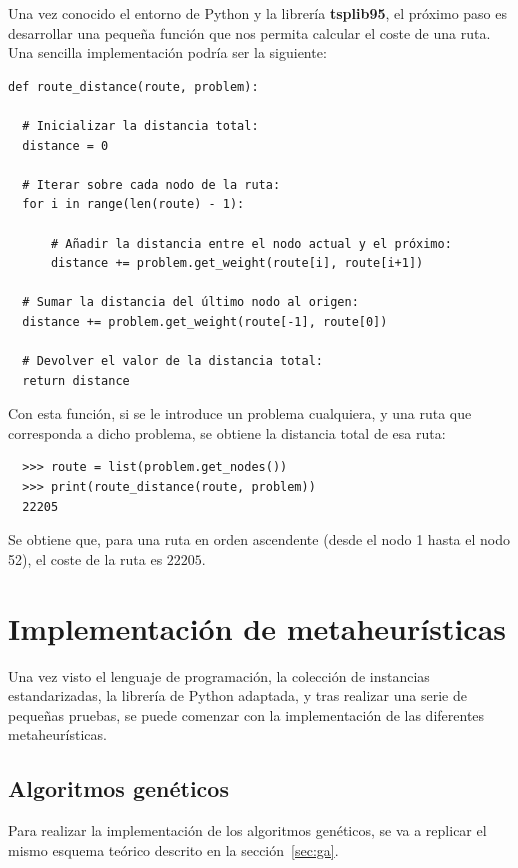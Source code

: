 Una vez conocido el entorno de Python y la librería \textbf{tsplib95}, el próximo paso es desarrollar una pequeña función
que nos permita calcular el coste de una ruta. Una sencilla implementación podría ser la siguiente:
\newline
\begin{lstlisting}[style=PythonStyle]
def route_distance(route, problem):

  # Inicializar la distancia total:
  distance = 0

  # Iterar sobre cada nodo de la ruta:
  for i in range(len(route) - 1):

      # Añadir la distancia entre el nodo actual y el próximo:
      distance += problem.get_weight(route[i], route[i+1])

  # Sumar la distancia del último nodo al origen:
  distance += problem.get_weight(route[-1], route[0])

  # Devolver el valor de la distancia total:
  return distance
\end{lstlisting}

Con esta función, si se le introduce un problema cualquiera, y una ruta que corresponda a dicho problema, se obtiene la 
distancia total de esa ruta:

\begin{verbatim}
  >>> route = list(problem.get_nodes())
  >>> print(route_distance(route, problem))
  22205
\end{verbatim}

Se obtiene que, para una ruta en orden ascendente (desde el nodo 1 hasta el nodo 52), el coste de la ruta es $22205$.

\section{Implementación de metaheurísticas}
\label{sec:metah_imp}

Una vez visto el lenguaje de programación, la colección de instancias estandarizadas, la librería de Python adaptada, y 
tras realizar una serie de pequeñas pruebas, se puede comenzar con la implementación de las diferentes metaheurísticas.

\subsection{Algoritmos genéticos}
\label{subsec:ga_imp}

Para realizar la implementación de los algoritmos genéticos, se va a replicar el mismo esquema teórico descrito en la 
sección~\ref{sec:ga}.


